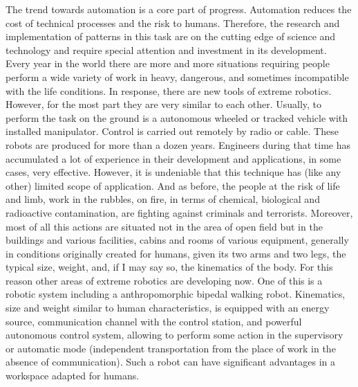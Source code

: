 \documentclass[11pt,a4paper]{article}
\begin{document}
The trend towards automation is a core part of progress. Automation reduces the cost of technical processes and the risk to humans. Therefore, the research and implementation of patterns in this task are on the cutting edge of science and technology and require special attention and investment in its development. Every year in the world there are more and more situations requiring people perform a wide variety of work in heavy, dangerous, and sometimes incompatible with the life conditions. In response, there are new tools of extreme robotics. However, for the most part they are very similar to each other. Usually, to perform the task on the ground is a autonomous wheeled or tracked vehicle with installed manipulator. Control is carried out remotely by radio or cable. These robots are produced for more than a dozen years. Engineers during that time has accumulated a lot of experience in their development and applications, in some cases, very effective. However, it is undeniable that this technique has (like any other) limited scope of application. And as before, the people at the risk of life and limb, work in the rubbles, on fire, in terms of chemical, biological and radioactive contamination, are fighting against criminals and terrorists. Moreover, most of all this actions are situated not in the area of open field but in the buildings and various facilities, cabins and rooms of various equipment,  generally in conditions originally created for humans, given its two arms and two legs, the typical size, weight, and, if I may say so, the kinematics of the body. For this reason other areas of extreme robotics are developing now. One of this is a robotic system including a anthropomorphic bipedal walking robot. Kinematics, size and weight  similar to human characteristics, is equipped with an energy source, communication channel with the control station, and powerful autonomous control system, allowing to perform some action in the supervisory or automatic mode (independent transportation from the place of work in the absence of communication). Such a robot can have significant advantages in a workspace adapted for humans.
\end{document}
